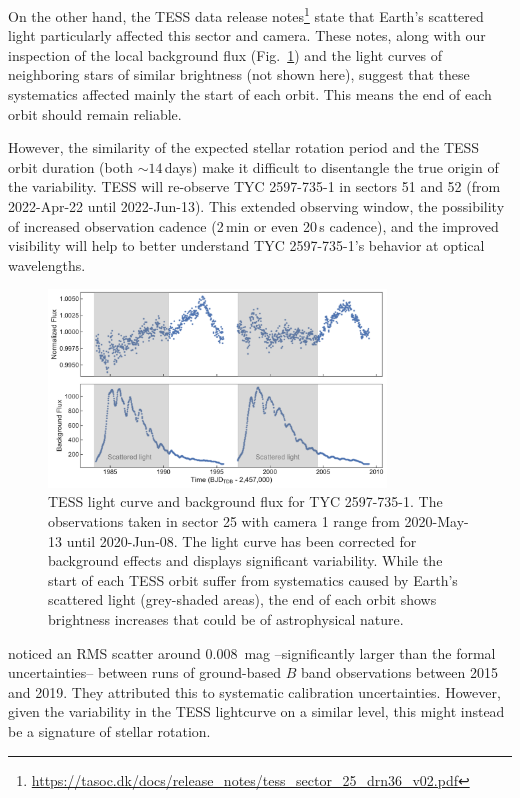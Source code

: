 \documentclass[linenumbers]{aastex631}
\begin{document}
On the other hand, the TESS data release notes\footnote{\url{https://tasoc.dk/docs/release_notes/tess_sector_25_drn36_v02.pdf}} state that Earth's scattered light particularly affected this sector and camera. These notes, along with our inspection of the local background flux (Fig.~\ref{fig:TESS_light_curve}) and the light curves of neighboring stars of similar brightness (not shown here), suggest that these systematics affected mainly the start of each orbit. This means the end of each orbit should remain reliable.

However, the similarity of the expected stellar rotation period and the TESS orbit duration (both $\sim14$\,days) make it difficult to disentangle the true origin of the variability. TESS will re-observe TYC 2597-735-1 in sectors 51 and 52 (from 2022-Apr-22 until 2022-Jun-13). This extended observing window, the possibility of increased observation cadence (2\,min or even 20\,s cadence), and the improved visibility will help to better understand TYC 2597-735-1's behavior at optical wavelengths.

\begin{figure}
    \centering
    \includegraphics[width=0.8\textwidth]{figures/TESS_light_curve.pdf}
    \caption{TESS light curve and background flux for TYC 2597-735-1. The observations taken in sector 25 with camera 1 range from 2020-May-13 until 2020-Jun-08. The light curve has been corrected for background effects and displays significant variability. While the start of each TESS orbit suffer from systematics caused by Earth's scattered light (grey-shaded areas), the end of each orbit shows brightness increases that could be of astrophysical nature.
    \label{fig:TESS_light_curve}}
\end{figure}

\cite{2020Natur.587..387H} noticed an RMS scatter around 0.008~mag --significantly larger than the formal uncertainties-- between runs of ground-based $B$ band observations between 2015 and 2019. They attributed this to systematic calibration uncertainties. However, given the variability in the TESS lightcurve on a similar level, this might instead be a signature of stellar rotation.
\end{document}
